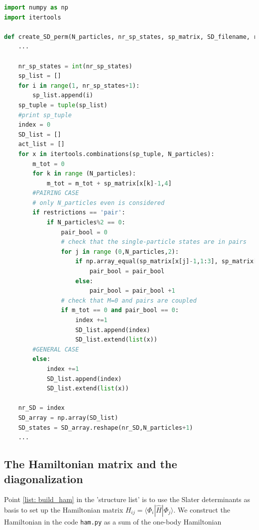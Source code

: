 \documentclass[twoside]{article}
\newcommand{\bra}[1]{\langle #1 |}
\newcommand{\ket}[1]{| #1 \rangle}
\begin{document}
\begin{lstlisting}[language=Python,label=create_SD,caption=The function \texttt{create\_SD\_perm} in the file \texttt{create\_table\_files.py} uses the Python function \texttt{itertools.combinations(,)} to create all the possible Slater determinants. In the case of the pairing model the Slater determinants are restricted to the ones with $\protect{M=0}$ and coupled pairs of single-particle states.]
import numpy as np
import itertools

def create_SD_perm(N_particles, nr_sp_states, sp_matrix, SD_filename, restrictions=''): 
    ...

    nr_sp_states = int(nr_sp_states)
    sp_list = []
    for i in range(1, nr_sp_states+1):
        sp_list.append(i)
    sp_tuple = tuple(sp_list)
    #print sp_tuple
    index = 0
    SD_list = []
    act_list = []
    for x in itertools.combinations(sp_tuple, N_particles):
        m_tot = 0
        for k in range (N_particles):
            m_tot = m_tot + sp_matrix[x[k]-1,4]
        #PAIRING CASE
        # only N_particles even is considered
        if restrictions == 'pair':
            if N_particles%2 == 0:
                pair_bool = 0
                # check that the single-particle states are in pairs
                for j in range (0,N_particles,2):
                    if np.array_equal(sp_matrix[x[j]-1,1:3], sp_matrix[x[j+1]-1,1:3]):
                        pair_bool = pair_bool 
                    else:
                        pair_bool = pair_bool +1
                # check that M=0 and pairs are coupled
                if m_tot == 0 and pair_bool == 0:
                    index +=1
                    SD_list.append(index)
                    SD_list.extend(list(x))
        #GENERAL CASE
        else:
            index +=1
            SD_list.append(index)
            SD_list.extend(list(x))
    
    nr_SD = index
    SD_array = np.array(SD_list)
    SD_states = SD_array.reshape(nr_SD,N_particles+1)
    ...

\end{lstlisting}

\subsection{The Hamiltonian matrix and the diagonalization}

Point \ref{list: build_ham} in the 'structure list' is to use the Slater determinants as basis to set up the Hamiltonian matrix $H_{ij}=\bra{\Phi_i} \hat H \ket{\Phi_j}$. We construct the Hamiltonian in the code \texttt{ham.py} as a sum of the one-body Hamiltonian
\end{document}
